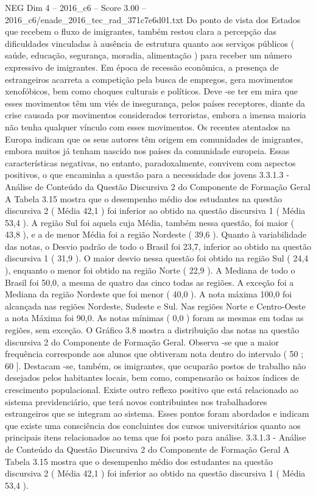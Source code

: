 \begin{textsample}{NEG Dim 4 – 2016\_c6 – Score 3.00 – 2016\_c6/enade\_2016\_tec\_rad\_371c7e6d01.txt}
Do ponto de vista dos Estados que recebem o fluxo de imigrantes, também restou clara a percepção das dificuldades vinculadas à ausência de estrutura quanto aos serviços públicos ( saúde, educação, segurança, moradia, alimentação ) para receber um número expressivo de imigrantes.
Em época de recessão econômica, a presença de estrangeiros acarreta a competição pela busca de empregos, gera movimentos xenofóbicos, bem como choques culturais e políticos.
Deve -se ter em mira que esses movimentos têm um viés de insegurança, pelos países receptores, diante da crise causada por movimentos considerados terroristas, embora a imensa maioria não tenha qualquer vínculo com esses movimentos.
Os recentes atentados na Europa indicam que os seus autores têm origem em comunidades de imigrantes, embora muitos já tenham nascido nos países da comunidade europeia.
Essas características negativas, no entanto, paradoxalmente, convivem com aspectos positivos, o que encaminha a questão para a necessidade dos jovens 3.3.1.3 - Análise de Conteúdo da Questão Discursiva 2 do Componente de Formação Geral A Tabela 3.15 mostra que o desempenho médio dos estudantes na questão discursiva 2 ( Média 42,1 ) foi inferior ao obtido na questão discursiva 1 ( Média 53,4 ).
A região Sul foi aquela cuja Média, também nessa questão, foi maior ( 43,8 ), e a de menor Média foi a região Nordeste ( 39,6 ).
Quanto à variabilidade das notas, o Desvio padrão de todo o Brasil foi 23,7, inferior ao obtido na questão discursiva 1 ( 31,9 ).
O maior desvio nessa questão foi obtido na região Sul ( 24,4 ), enquanto o menor foi obtido na região Norte ( 22,9 ).
A Mediana de todo o Brasil foi 50,0, a mesma de quatro das cinco todas as regiões.
A exceção foi a Mediana da região Nordeste que foi menor ( 40,0 ).
A nota máxima 100,0 foi alcançada nas regiões Nordeste, Sudeste e Sul.
Nas regiões Norte e Centro-Oeste a nota Máxima foi 90,0.
As notas mínimas ( 0,0 ) foram as mesmas em todas as regiões, sem exceção.
O Gráfico 3.8 mostra a distribuição das notas na questão discursiva 2 do Componente de Formação Geral.
Observa -se que a maior frequência corresponde aos alunos que obtiveram nota dentro do intervalo ( 50 ; 60 ].
Destacam -se, também, os imigrantes, que ocuparão postos de trabalho não desejados pelos habitantes locais, bem como, compensarão os baixos índices de crescimento populacional.
Existe outro reflexo positivo que está relacionado ao sistema previdenciário, que terá novos contribuintes nos trabalhadores estrangeiros que se integram ao sistema.
Esses pontos foram abordados e indicam que existe uma consciência dos concluintes dos cursos universitários quanto aos principais itens relacionados ao tema que foi posto para análise. 3.3.1.3 - Análise de Conteúdo da Questão Discursiva 2 do Componente de Formação Geral A Tabela 3.15 mostra que o desempenho médio dos estudantes na questão discursiva 2 ( Média 42,1 ) foi inferior ao obtido na questão discursiva 1 ( Média 53,4 ).

\end{textsample}
